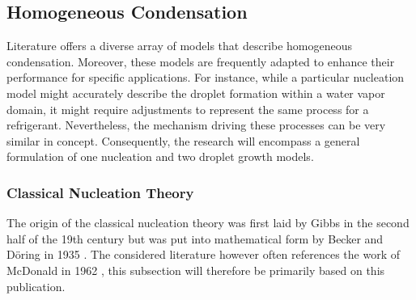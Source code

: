 \documentclass[12pt]{article}
\numberwithin{equation}{section}
\begin{document}
\subsection{Homogeneous Condensation}\label{ss:Literature-Homogeneous}
Literature offers a diverse array of models that describe homogeneous condensation. Moreover, these models are frequently adapted to enhance their performance for specific applications. For instance, while a particular nucleation model might accurately describe the droplet formation within a water vapor domain, it might require adjustments to represent the same process for a refrigerant. Nevertheless, the mechanism driving these processes can be very similar in concept. Consequently, the research will encompass a general formulation of one nucleation and two droplet growth models. 

\subsubsection{Classical Nucleation Theory}\label{sss:Literature-CNT}
The origin of the classical nucleation theory was first laid by Gibbs \cite{gibbs1957method} in the second half of the 19th century but was put into mathematical form by Becker and Döring in 1935 \cite{becker1935kinetische}. The considered literature however often references the work of McDonald in 1962 \cite{mcdonald1962homogeneous}, this subsection will therefore be primarily based on this publication. 
\end{document}
